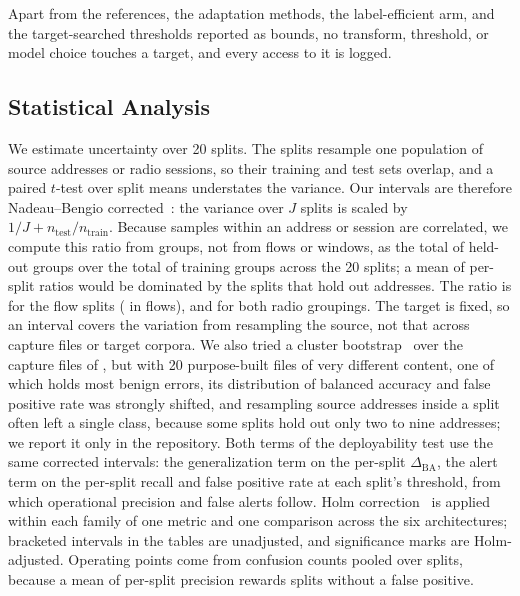 Apart from the references, the adaptation methods, the label-efficient arm, and the target-searched thresholds reported as bounds, no transform, threshold, or model choice touches a target, and every access to it is logged.

\subsection{Statistical Analysis}
\label{sec:stats}

We estimate uncertainty over 20 splits. The splits resample one population of source addresses or radio sessions, so their training and test sets overlap, and a paired $t$-test over split means understates the variance. Our intervals are therefore Nadeau--Bengio corrected~\cite{nadeau2003inference}: the variance over $J$ splits is scaled by $1/J + n_{\mathrm{test}}/n_{\mathrm{train}}$. Because samples within an address or session are correlated, we compute this ratio from groups, not from flows or windows, as the total of held-out groups over the total of training groups across the 20 splits; a mean of per-split ratios would be dominated by the splits that hold out \RCovTestGroupsMax{} addresses. The ratio is \RNbRatioGroups{} for the flow splits (\RNbRatioFlows{} in flows), and \RRadRatioSess{} for both radio groupings. The target is fixed, so an interval covers the variation from resampling the source, not that across capture files or target corpora. We also tried a cluster bootstrap~\cite{field2007bootstrapping} over the capture files of \DB{}, but with 20 purpose-built files of very different content, one of which holds most benign errors, its distribution of balanced accuracy and false positive rate was strongly shifted, and resampling source addresses inside a split often left a single class, because some splits hold out only two to nine addresses; we report it only in the repository. Both terms of the deployability test use the same corrected intervals: the generalization term on the per-split $\Delta_{\mathrm{BA}}$, the alert term on the per-split recall and false positive rate at each split's threshold, from which operational precision and false alerts follow. Holm correction~\cite{holm1979simple} is applied within each family of one metric and one comparison across the six architectures; bracketed intervals in the tables are unadjusted, and significance marks are Holm-adjusted. Operating points come from confusion counts pooled over splits, because a mean of per-split precision rewards splits without a false positive.

